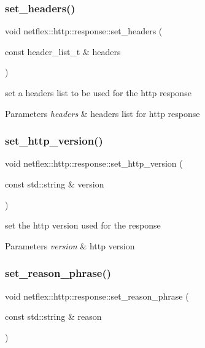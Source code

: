 \subsubsection{\texorpdfstring{set\+\_\+headers()}{set\_headers()}}
{\footnotesize\ttfamily void netflex\+::http\+::response\+::set\+\_\+headers (\begin{DoxyParamCaption}\item[{const header\+\_\+list\+\_\+t \&}]{headers }\end{DoxyParamCaption})}

set a headers list to be used for the http response


\begin{DoxyParams}{Parameters}
{\em headers} & headers list for http response \\
\hline
\end{DoxyParams}
\mbox{\label{classnetflex_1_1http_1_1response_af183e759ed09bb71eb838fa69fa0c1bf}} 
\subsubsection{\texorpdfstring{set\+\_\+http\+\_\+version()}{set\_http\_version()}}
{\footnotesize\ttfamily void netflex\+::http\+::response\+::set\+\_\+http\+\_\+version (\begin{DoxyParamCaption}\item[{const std\+::string \&}]{version }\end{DoxyParamCaption})}

set the http version used for the response


\begin{DoxyParams}{Parameters}
{\em version} & http version \\
\hline
\end{DoxyParams}
\mbox{\label{classnetflex_1_1http_1_1response_abd5b17d8d4291f17351a8e6182a0a073}} 
\subsubsection{\texorpdfstring{set\+\_\+reason\+\_\+phrase()}{set\_reason\_phrase()}}
{\footnotesize\ttfamily void netflex\+::http\+::response\+::set\+\_\+reason\+\_\+phrase (\begin{DoxyParamCaption}\item[{const std\+::string \&}]{reason }\end{DoxyParamCaption})}

